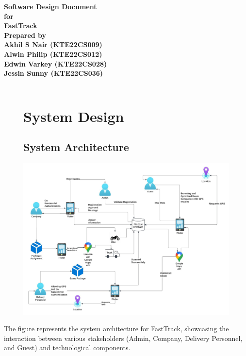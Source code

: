 \documentclass{article}
\begin{document}
\begin{center}
\textbf{\Huge Software Design Document}\\
\vspace{70pt}
\textbf{\Large for}\\
\vspace{60pt}
\textbf{\LARGE FastTrack}\\
\vspace{40pt}
\textbf{\large Prepared by}\\
\vspace{30pt}
\textbf{\Large Akhil S Nair (KTE22CS009)}\\
\vspace{30pt}
\textbf{\Large Alwin Philip (KTE22CS012)}\\
\vspace{30pt}
\textbf{\Large Edwin Varkey (KTE22CS028)}\\
\vspace{30pt}
\textbf{\Large Jessin Sunny (KTE22CS036)}\\
\vspace{70pt}
\\
\vspace{20pt}
\end{center}
\newpage
\tableofcontents
\newpage
\begin{figure}
\section{System Design}
\subsection{System Architecture}
\centering
\includegraphics[scale=0.5]{System Architecture.jpeg}
\end{figure}
The figure represents the system architecture for FastTrack, showcasing the interaction between various stakeholders (Admin, Company, Delivery Personnel, and Guest) and technological components.
\end{document}
